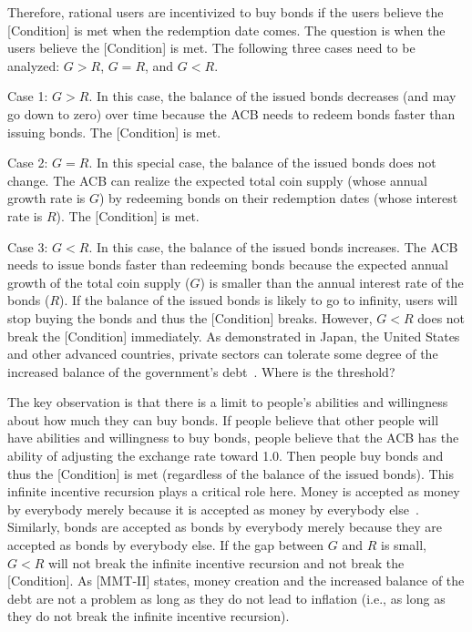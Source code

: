 \documentclass[dvipdfmx,a4paper]{article}
\begin{document}
Therefore, rational users are incentivized to buy bonds if the users believe the [Condition] is met when the redemption date comes. The question is when the users believe the [Condition] is met. The following three cases need to be analyzed: $G>R$, $G=R$, and $G<R$.

Case 1: $G>R$. In this case, the balance of the issued bonds decreases (and may go down to zero) over time because the ACB needs to redeem bonds faster than issuing bonds. The [Condition] is met.

Case 2: $G=R$. In this special case, the balance of the issued bonds does not change. The ACB can realize the expected total coin supply (whose annual growth rate is $G$) by redeeming bonds on their redemption dates (whose interest rate is $R$). The [Condition] is met.

Case 3: $G<R$. In this case, the balance of the issued bonds increases. The ACB needs to issue bonds faster than redeeming bonds because the expected annual growth of the total coin supply ($G$) is smaller than the annual interest rate of the bonds ($R$). If the balance of the issued bonds is likely to go to infinity, users will stop buying the bonds and thus the [Condition] breaks. However, $G<R$ does not break the [Condition] immediately. As demonstrated in Japan, the United States and other advanced countries, private sectors can tolerate some degree of the increased balance of the government's debt~\cite{elmendorf1999government}. Where is the threshold?

The key observation is that there is a limit to people's abilities and willingness about how much they can buy bonds. If people believe that other people will have abilities and willingness to buy bonds, people believe that the ACB has the ability of adjusting the exchange rate toward 1.0. Then people buy bonds and thus the [Condition] is met (regardless of the balance of the issued bonds). This infinite incentive recursion plays a critical role here. Money is accepted as money by everybody merely because it is accepted as money by everybody else~\cite{iwai1996boostrap,iwai1997evolution}. Similarly, bonds are accepted as bonds by everybody merely because they are accepted as bonds by everybody else. If the gap between $G$ and $R$ is small, $G<R$ will not break the infinite incentive recursion and not break the [Condition]. As [MMT-II] states, money creation and the increased balance of the debt are not a problem as long as they do not lead to inflation (i.e., as long as they do not break the infinite incentive recursion).
\end{document}
